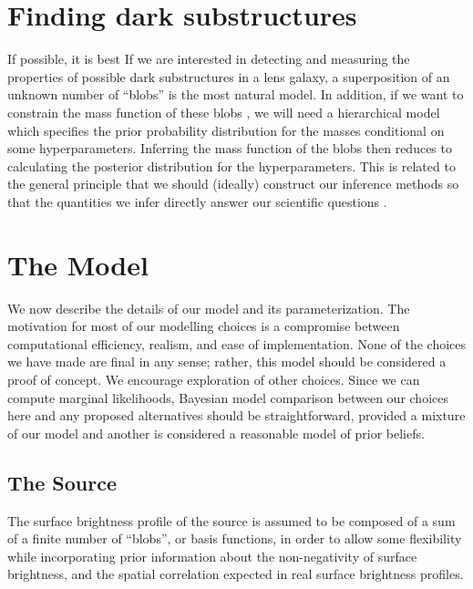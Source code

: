 \documentclass[useAMS,usenatbib]{mn2e}
\begin{document}
\section{Finding dark substructures}
If possible, it is best
If we are interested in detecting and measuring the properties of
possible dark substructures in a lens galaxy,
a superposition of an unknown number of ``blobs'' is the
most natural model. In addition, if we want to constrain the mass function of
these blobs \citep[e.g.][]{2009MNRAS.400.1583V, 2014MNRAS.442.2017V},
we will need a hierarchical model which specifies the prior probability
distribution for the masses conditional on some hyperparameters. Inferring the
mass function of the blobs then reduces to calculating the posterior
distribution for the hyperparameters. This is related to the general principle
that we should (ideally) construct our inference methods so that the
quantities we infer directly answer our scientific questions
\citep{2015arXiv150507840A, 2015ApJ...807...87S, pancoast}.

\section{The Model}
We now describe the details of our model and its parameterization. The
motivation for most of our modelling choices is a compromise between
computational efficiency, realism, and ease of implementation. None of the
choices we have made are final in any sense; rather, this model should be
considered a proof of concept. We encourage exploration of
other choices. Since we can compute marginal likelihoods, Bayesian model
comparison between our choices here and any proposed alternatives should be
straightforward, provided a mixture of our model and another is considered
a reasonable model of prior beliefs.

\subsection{The Source}
The surface brightness profile of the source is assumed to be composed of
a sum of a finite number of ``blobs'', or basis functions, in order to
allow some flexibility while incorporating prior information about the
non-negativity of surface brightness, and the spatial correlation expected
in real surface brightness profiles.
\end{document}
